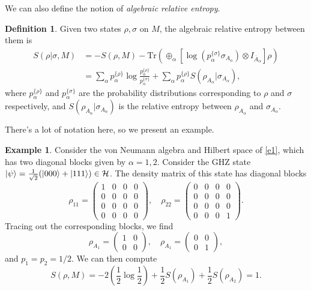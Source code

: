\documentclass[12pt,a4paper]{report}
\numberwithin{equation}{section}
\newcommand{\ol}[1]{\overline{#1}}
\newcommand{\tr}{\text{Tr}}
\theoremstyle{definition}
\newtheorem{definition}{Definition}[section]
\theoremstyle{theorem}
\theoremstyle{theorem}
\theoremstyle{example}
\newtheorem{example}{Example}[section]
\theoremstyle{definition}
\begin{document}
We can also define the notion of \textit{algebraic relative entropy}.
\begin{definition}
	Given two states $\rho,\sigma$ on $M$, the algebraic relative entropy between them is
	\begin{equation}
		\begin{aligned}
			S(\rho|\sigma,M)&=-S(\rho,M)-\tr\left(\oplus_{\alpha}\left[\log\left(p_{\alpha}^{\{\sigma\}}\sigma_{A_{\alpha}}\right)\otimes I_{\ol{A}_{\alpha}}\right]\rho\right)\\&=\sum_{\alpha}p_{\alpha}^{\{\rho\}}\log\frac{p_{\alpha}^{\{\rho\}}}{p_{\alpha}^{\{\sigma\}}}+\sum_{\alpha}p_{\alpha}^{\{\rho\}}S(\rho_{A_{\alpha}}|\sigma_{A_{\alpha}}),
		\end{aligned}
	\end{equation}
	where $p_{\alpha}^{\{\rho\}}$ and $p_{\alpha}^{\{\sigma\}}$ are the probability distributions corresponding to $\rho$ and $\sigma$ respectively, and $S(\rho_{A_{\alpha}}|\sigma_{A_{\alpha}})$ is the relative entropy between $\rho_{A_{\alpha}}$ and $\sigma_{A_{\alpha}}$.
\end{definition}
There's a lot of notation here, so we present an example.
\begin{example}
	Consider the von Neumann algebra and Hilbert space of \ref{e1}, which has two diagonal blocks given by $\alpha=1,2$. Consider the GHZ state $\ket{\psi}=\frac{1}{\sqrt{2}}(\ket{000}+\ket{111})\in\mathcal{H}$. The density matrix of this state has diagonal blocks
	\begin{equation}
		\rho_{11}=\begin{pmatrix}
			1&0&0&0\\
			0&0&0&0\\
			0&0&0&0\\
			0&0&0&0
		\end{pmatrix},\quad\rho_{22}=\begin{pmatrix}
		0&0&0&0\\
		0&0&0&0\\
		0&0&0&0\\
		0&0&0&1
	\end{pmatrix}.
	\end{equation}
	Tracing out the corresponding blocks, we find
	\begin{equation}
		\rho_{A_{1}}=\begin{pmatrix}1&0\\0&0\end{pmatrix},\quad\rho_{A_{1}}=\begin{pmatrix}0&0\\0&1\end{pmatrix},
	\end{equation}
	and $p_{1}=p_{2}=1/2$. We can then compute
	\begin{equation}
		S(\rho,M)=-2\left(\frac{1}{2}\log\frac{1}{2}\right)+\frac{1}{2}S(\rho_{A_{1}})+\frac{1}{2}S(\rho_{A_{2}})=1.
	\end{equation}
\end{example}
\end{document}
